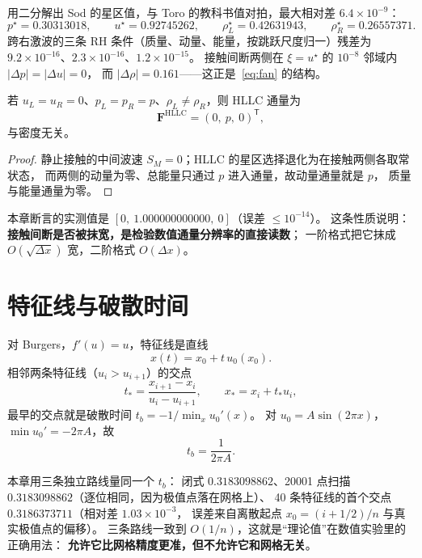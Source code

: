用二分解出 Sod 的星区值，与 Toro 的教科书值对拍，最大相对差
$6.4\times10^{-9}$：
\[
  p^\star=0.30313018,\qquad u^\star=0.92745262,\qquad
  \rho^\star_L=0.42631943,\qquad \rho^\star_R=0.26557371 .
\]
跨右激波的三条 RH 条件（质量、动量、能量，按跳跃尺度归一）残差为
$9.2\times10^{-16}$、$2.3\times10^{-16}$、$1.2\times10^{-15}$。
接触间断两侧在 $\xi=u^\star$ 的 $10^{-8}$ 邻域内 $|\Delta p|=|\Delta u|=0$，
而 $|\Delta\rho|=0.161$——这正是~\eqref{eq:fan} 的结构。

\begin{theorem}
\label{thm:hllc-contact}
若 $u_L=u_R=0$、$p_L=p_R=p$、$\rho_L\ne\rho_R$，则 HLLC 通量为
\begin{equation}
  \mathbf F^{\text{HLLC}}=(0,\ p,\ 0)^{\mathsf T},
\end{equation}
与密度无关。
\end{theorem}

\begin{proof}
静止接触的中间波速 $S_M=0$；HLLC 的星区选择退化为在接触两侧各取常状态，
而两侧的动量为零、总能量只通过 $p$ 进入通量，故动量通量就是 $p$，
质量与能量通量为零。
\end{proof}

本章断言的实测值是 $[0,\ 1.000000000000,\ 0]$（误差 $\le10^{-14}$）。
这条性质说明：\textbf{接触间断是否被抹宽，是检验数值通量分辨率的直接读数}；
一阶格式把它抹成 $O(\sqrt{\Delta x})$ 宽，二阶格式 $O(\Delta x)$。

\section{特征线与破散时间}

对 Burgers，$f'(u)=u$，特征线是直线
\begin{equation}
  x(t)=x_0+t\,u_0(x_0).
  \label{eq:char}
\end{equation}
相邻两条特征线（$u_i>u_{i+1}$）的交点
\begin{equation}
  t_\ast=\frac{x_{i+1}-x_i}{u_i-u_{i+1}},
  \qquad
  x_\ast=x_i+t_\ast u_i,
  \label{eq:cross}
\end{equation}
最早的交点就是破散时间 $t_b=-1/\min_x u_0'(x)$。
对 $u_0=A\sin(2\pi x)$，$\min u_0'=-2\pi A$，故
\begin{equation}
  t_b=\frac{1}{2\pi A}.
  \label{eq:tb}
\end{equation}

本章用三条独立路线量同一个 $t_b$：
闭式 $0.3183098862$、20001 点扫描 $0.3183098862$（逐位相同，因为极值点落在网格上）、
40 条特征线的首个交点 $0.3186373711$（相对差 $1.03\times10^{-3}$，
误差来自离散起点 $x_0=(i+1/2)/n$ 与真实极值点的偏移）。
三条路线一致到 $O(1/n)$，这就是``理论值''在数值实验里的正确用法：
\textbf{允许它比网格精度更准，但不允许它和网格无关}。

